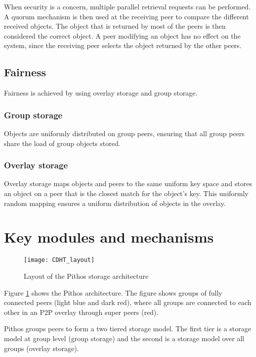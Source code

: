 When security is a concern, multiple parallel retrieval requests can be performed. A quorum mechanism is then used at the receiving peer to compare the different received objects. The object that is returned by most of the peers is then considered the correct object. A peer modifying an object has no effect on the system, since the receiving peer selects the object returned by the other peers.

\subsection{Fairness}

Fairness is achieved by using overlay storage and group storage.

\subsubsection{Group storage}

Objects are uniformly distributed on group peers, ensuring that all group peers share the load of group objects stored.

\subsubsection{Overlay storage}

Overlay storage maps objects and peers to the same uniform key space and stores an object on a peer that is the closest match for the object's key. This uniformly random mapping ensures a uniform distribution of objects in the overlay.


\section{Key modules and mechanisms}
\label{key_modules_mechs}

\begin{figure}[htbp]
 \centering
 \texttt{[image: CDHT\_layout]}
 \caption{Layout of the Pithos storage architecture}
 \label{fig_pithos}
\end{figure}
%
Figure \ref{fig_pithos} shows the Pithos architecture. The figure shows groups of fully connected peers (light blue and dark red), where all groups are connected to each other in an P2P overlay through super peers (red).

Pithos groups peers to form a two tiered storage model. The first tier is a storage model at group level (group storage) and the second is a storage model over all groups (overlay storage).

